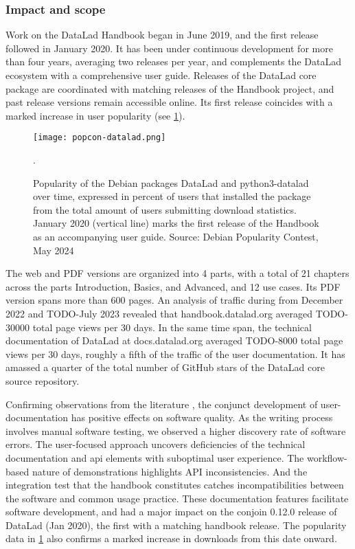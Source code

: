 \subsubsection{Impact and scope}

Work on the DataLad Handbook began in June 2019, and the first release followed in January 2020.
It has been under continuous development for more than four years, averaging two releases per year, and complements  the DataLad ecosystem with a comprehensive user guide.
Releases of the DataLad core package are coordinated with matching releases of the Handbook project, and past release versions remain accessible online.
Its first release coincides with a marked increase in user popularity (see \cref{fig:popcon}).

\begin{figure}
	\centering
	\texttt{[image: popcon-datalad.png]}
	\caption[Debian package popularity counts for DataLad]{Popularity of the Debian packages DataLad and python3-datalad over time, expressed in percent of users that installed the package from the total amount of users submitting download statistics. January 2020 (vertical line) marks the first release of the Handbook as an accompanying user guide. Source: Debian Popularity Contest, May 2024}.
	\label{fig:popcon}
\end{figure}


The web and PDF versions are organized into 4 parts, with a total of 21 chapters across the parts Introduction, Basics, and Advanced, and 12 use cases.
Its PDF version spans more than 600 pages.
An analysis of traffic during from December 2022 and TODO-July 2023 revealed that handbook.datalad.org averaged TODO-30000 total page views per 30 days.
In the same time span, the technical documentation of DataLad at docs.datalad.org averaged TODO-8000 total page views per 30 days, roughly a fifth of the traffic of the user documentation. 
It has amassed a quarter of the total number of GitHub stars of the DataLad core source repository.

Confirming observations from the literature \citep{loggemDDD}, the conjunct development of user-documentation has positive effects on software quality.
As the writing process involves manual software testing, we observed a higher discovery rate of software errors.
The user-focused approach uncovers deficiencies of the technical documentation and \gls{api} elements with suboptimal user experience.
The workflow-based nature of demonstrations highlights API inconsistencies.
And the integration test that the handbook constitutes catches incompatibilities between the software and common usage practice.
These documentation features facilitate software development, and had a major impact on the conjoin 0.12.0 release of DataLad (Jan 2020), the first with a matching handbook release.
The popularity data in \cref{fig:popcon} also confirms a marked increase in downloads from this date onward.

